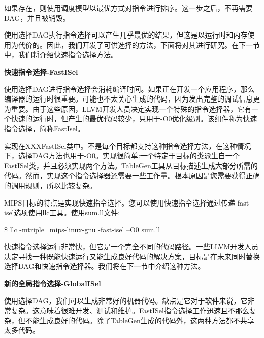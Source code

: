 如果存在，则使用调度模型以最优方式对指令进行排序。这一步之后，不再需要DAG，并且被销毁。\par

使用选择DAG执行指令选择可以产生几乎最优的结果，但这是以运行时和内存使用为代价的。因此，我们开发了可供选择的方法，下面将对其进行研究。在下一节中，我们将介绍快速指令选择方法。\par

\hspace*{\fill} \par %
\textbf{快速指令选择-FastISel}

使用选择DAG进行指令选择会消耗编译时间。如果正在开发一个应用程序，那么编译器的运行时很重要。可能也不太关心生成的代码，因为发出完整的调试信息更为重要。由于这些原因，LLVM开发人员决定实现一个特殊的指令选择器，它有一个快速的运行时，但产生的最优代码较少，只用于-O0优化级别。该组件称为快速指令选择，简称FastIsel。\par

实现在XXXFastISel类中。不是每个目标都支持这种指令选择方法，在这种情况下，选择DAG方法也用于-O0。实现很简单:一个特定于目标的类派生自一个FastISel类，并且必须实现两个方法。TableGen工具从目标描述生成大部分所需的代码。然而，实现这个指令选择器还需要一些工作量。根本原因是您需要获得正确的调用规则，所以比较复杂。\par

MIPS目标的特点是实现快速指令选择。您可以使用快速指令选择通过传递-fast-isel选项使用llc工具。使用sum.ll文件:\par

\begin{tcolorbox}[colback=white,colframe=black]
\$ llc -mtriple=mips-linux-gnu -fast-isel –O0 sum.ll
\end{tcolorbox}

快速指令选择运行非常快，但它是一个完全不同的代码路径。一些LLVM开发人员决定寻找一种既能快速运行又能生成良好代码的解决方案，目标是在未来同时替换选择DAG和快速指令选择器。我们将在下一节中介绍这种方法。\par

\hspace*{\fill} \par %
\textbf{新的全局指令选择-GlobalISel}

使用选择DAG，我们可以生成非常好的机器代码。缺点是它对于软件来说，它非常复杂。这意味着很难开发、测试和维护。FastISel指令选择工作迅速且不那么复杂，但不能生成良好的代码。除了TableGen生成的代码外，这两种方法都不共享太多代码。\par

